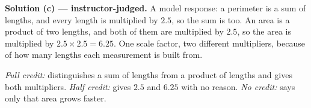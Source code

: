 \documentclass[12pt]{article}
\begin{document}
\textbf{Solution (c) --- instructor-judged.} A model response: a perimeter is a sum of lengths, and every length is multiplied by $2.5$, so the sum is too. An area is a product of two lengths, and both of them are multiplied by $2.5$, so the area is multiplied by $2.5 \times 2.5 = 6.25$. One scale factor, two different multipliers, because of how many lengths each measurement is built from.

\emph{Full credit:} distinguishes a sum of lengths from a product of lengths and gives both multipliers. \emph{Half credit:} gives $2.5$ and $6.25$ with no reason. \emph{No credit:} says only that area grows faster.
\end{document}
